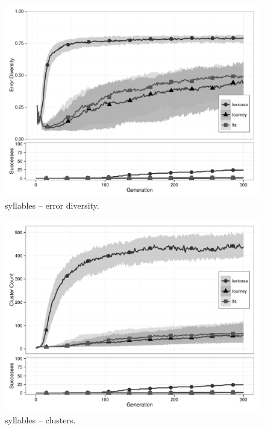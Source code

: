 \begin{figure}%
\centering
\includegraphics[width=11.5cm]{syllables-diversity.pdf}
\caption{syllables -- error diversity.}
\label{syllablesDiv}
\end{figure}

\begin{figure}%
\centering
\includegraphics[width=11.5cm]{syllables-cluster.pdf}
\caption{syllables -- clusters.}
\label{syllablesClu}
\end{figure}

